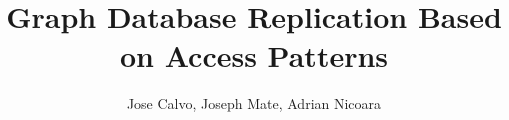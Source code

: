 \documentclass[a4paper,10pt]{article}
\begin{document}
\title{Graph Database Replication Based on Access Patterns}
\author{Jose Calvo, Joseph Mate, Adrian Nicoara}
\maketitle




\nocite{*}


\end{document}
